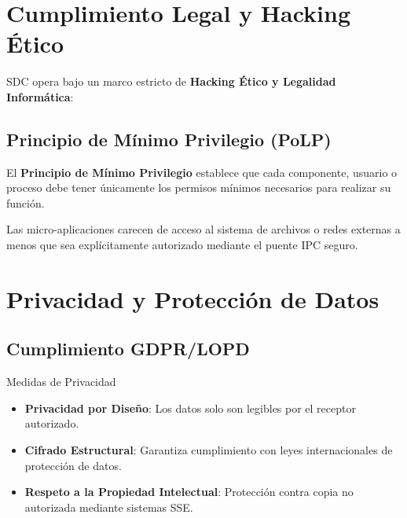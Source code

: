\section{Cumplimiento Legal y Hacking Ético}

SDC opera bajo un marco estricto de \textbf{Hacking Ético y Legalidad Informática}:

\subsection{Principio de Mínimo Privilegio (PoLP)}

\begin{definicion}
El \textbf{Principio de Mínimo Privilegio} establece que cada componente, usuario o proceso debe tener únicamente los permisos mínimos necesarios para realizar su función.
\end{definicion}


Las micro-aplicaciones carecen de acceso al sistema de archivos o redes externas a menos que sea explícitamente autorizado mediante el puente IPC seguro.


\section{Privacidad y Protección de Datos}

\subsection{Cumplimiento GDPR/LOPD}

\begin{caja}{Medidas de Privacidad}
\begin{itemize}
\item \textbf{Privacidad por Diseño}: Los datos solo son legibles por el receptor autorizado.
\item \textbf{Cifrado Estructural}: Garantiza cumplimiento con leyes internacionales de protección de datos.
\item \textbf{Respeto a la Propiedad Intelectual}: Protección contra copia no autorizada mediante sistemas SSE.
\end{itemize}
\end{caja}

